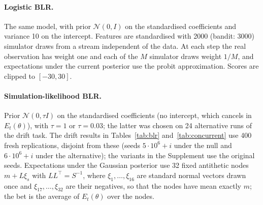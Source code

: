 \documentclass[12pt]{article}
\theoremstyle{remark}
\begin{document}
\paragraph{Logistic BLR.} The same model, with prior $\mathcal N(0, I)$ on the
standardised coefficients and variance 10 on the intercept. Features are
standardised with 2000 (bandit: 3000) simulator draws from a stream
independent of the data. At each step the real observation has weight one and
each of the $M$ simulator draws weight $1/M$, and expectations under the
current posterior use the probit approximation. Scores are clipped to
$[-30, 30]$.

\paragraph{Simulation-likelihood BLR.} Prior $\mathcal N(0, \tau I)$ on the
standardised coefficients (no intercept, which cancels in $E_t(\theta)$), with
$\tau = 1$ or $\tau = 0.03$; the latter was chosen on 24 alternative runs of the
drift task. The drift results in Tables~\ref{tab:blr} and~\ref{tab:concurrent}
use 400 fresh replications, disjoint from these (seeds $5\cdot10^6+i$ under the
null and $6\cdot10^6+i$ under the alternative); the variants in the Supplement
use the original seeds. Expectations under the Gaussian
posterior use 32 fixed antithetic nodes $m + L\xi_s$ with $LL^\top = S^{-1}$,
where $\xi_1, \ldots, \xi_{16}$ are standard normal vectors drawn once and
$\xi_{17}, \ldots, \xi_{32}$ are their negatives, so that the nodes have mean
exactly $m$; the bet is the average of $E_t(\theta)$ over the nodes.
\end{document}
